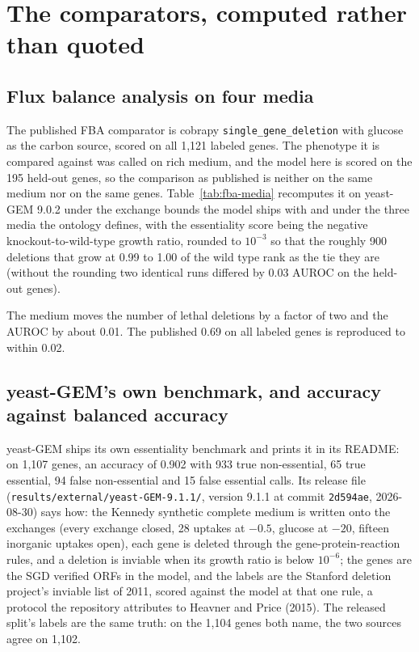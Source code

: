 
\section{The comparators, computed rather than quoted}
\label{sec:comparators}

\subsection{Flux balance analysis on four media}

The published FBA comparator is cobrapy \texttt{single\_gene\_deletion} with glucose as the
carbon source, scored on all 1,121 labeled genes. The phenotype it is compared against was
called on rich medium, and the model here is scored on the 195 held-out genes, so the
comparison as published is neither on the same medium nor on the same genes.
Table~\ref{tab:fba-media} recomputes it on yeast-GEM 9.0.2 under the exchange bounds the
model ships with and under the three media the ontology defines, with the essentiality
score being the negative knockout-to-wild-type growth ratio, rounded to $10^{-3}$ so that
the roughly 900 deletions that grow at 0.99 to 1.00 of the wild type rank as the tie they
are (without the rounding two identical runs differed by 0.03 AUROC on the held-out genes).



The medium moves the number of lethal deletions by a factor of two and the AUROC by about
0.01. The published 0.69 on all labeled genes is reproduced to within 0.02.

\subsection{yeast-GEM's own benchmark, and accuracy against balanced accuracy}

yeast-GEM ships its own essentiality benchmark and prints it in its README: on 1,107
genes, an accuracy of 0.902 with 933 true non-essential, 65 true essential, 94 false
non-essential and 15 false essential calls. Its release file
(\texttt{results/external/yeast-GEM-9.1.1/}, version 9.1.1 at commit \texttt{2d594ae},
2026-08-30) says how: the Kennedy synthetic complete medium is written onto the
exchanges (every exchange closed, 28 uptakes at $-0.5$, glucose at $-20$, fifteen
inorganic uptakes open), each gene is deleted through the gene-protein-reaction rules,
and a deletion is inviable when its growth ratio is below $10^{-6}$; the genes are the
SGD verified ORFs in the model, and the labels are the Stanford deletion project's
inviable list of 2011, scored against the model at that one rule, a protocol the
repository attributes to Heavner and Price (2015). The released split's labels are the
same truth: on the 1,104 genes both name, the two sources agree on 1,102.

